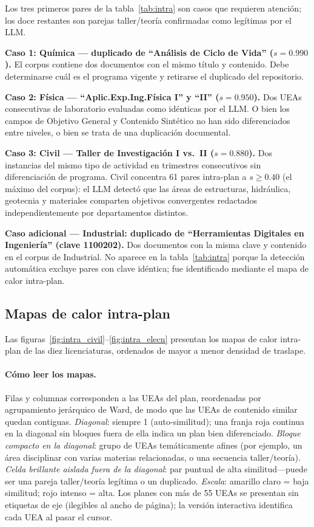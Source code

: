 \documentclass[11pt,a4paper]{article}
\begin{document}
Los tres primeros pares de la tabla~\ref{tab:intra} son casos que requieren atención; los doce restantes son parejas taller/teoría confirmadas como legítimas por el LLM.

\textbf{Caso 1: Química --- duplicado de ``Análisis de Ciclo de Vida'' ($s = 0.990$).}
El corpus contiene dos documentos con el mismo título y contenido.
Debe determinarse cuál es el programa vigente y retirarse el duplicado del repositorio.

\textbf{Caso 2: Física --- ``Aplic.\@ Exp.\@ Ing.\@ Física I'' y ``II'' ($s = 0.950$).}
Dos UEAs consecutivas de laboratorio evaluadas como idénticas por el LLM.
O bien los campos de Objetivo General y Contenido Sintético no han sido diferenciados entre niveles, o bien se trata de una duplicación documental.

\textbf{Caso 3: Civil --- Taller de Investigación I vs.\  II ($s = 0.880$).}
Dos instancias del mismo tipo de actividad en trimestres consecutivos sin diferenciación de programa.
Civil concentra 61 pares intra-plan a $s \geq 0.40$ (el máximo del corpus): el LLM detectó que las áreas de estructuras, hidráulica, geotecnia y materiales comparten objetivos convergentes redactados independientemente por departamentos distintos.

\textbf{Caso adicional --- Industrial: duplicado de ``Herramientas Digitales en Ingeniería'' (clave 1100202).}
Dos documentos con la misma clave y contenido en el corpus de Industrial.
No aparece en la tabla~\ref{tab:intra} porque la detección automática excluye pares con clave idéntica; fue identificado mediante el mapa de calor intra-plan.

\subsection{Mapas de calor intra-plan}

Las figuras~\ref{fig:intra_civil}--\ref{fig:intra_elecn} presentan los mapas de calor intra-plan de las diez licenciaturas, ordenados de mayor a menor densidad de traslape.

\paragraph{Cómo leer los mapas.}
Filas y columnas corresponden a las UEAs del plan, reordenadas por agrupamiento jerárquico de Ward, de modo que las UEAs de contenido similar quedan contiguas.
\emph{Diagonal}: siempre 1 (auto-similitud); una franja roja continua en la diagonal sin bloques fuera de ella indica un plan bien diferenciado.
\emph{Bloque compacto en la diagonal}: grupo de UEAs temáticamente afines (por ejemplo, un área disciplinar con varias materias relacionadas, o una secuencia taller/teoría).
\emph{Celda brillante aislada fuera de la diagonal}: par puntual de alta similitud---puede ser una pareja taller/teoría legítima o un duplicado.
\emph{Escala}: amarillo claro = baja similitud; rojo intenso = alta.
Los planes con más de 55 UEAs se presentan sin etiquetas de eje (ilegibles al ancho de página); la versión interactiva identifica cada UEA al pasar el cursor.
\end{document}
